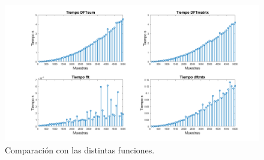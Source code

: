 \documentclass[letterpaper,onecolumn,10pt,journal,final]{IEEEtran}
\begin{document}
\begin{enumerate}[1)]
\begin{figure}[H]
\centering
\includegraphics[width=1 \linewidth]{Figuras/V4.png}
\caption{Comparación con las distintas funciones.}
\label{V4}
\end{figure}
\end{enumerate}
%
%
\end{document}
